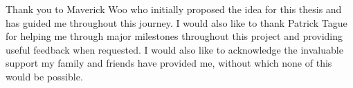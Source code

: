 \acknowledgements

\setcounter{page}{2}

Thank you to Maverick Woo who initially proposed the idea for this thesis and has guided me throughout this journey. I would also like to thank Patrick Tague for helping me through major milestones throughout this project and providing useful feedback when requested. I would also like to acknowledge the invaluable support my family and friends have provided me, without which none of this would be possible.
